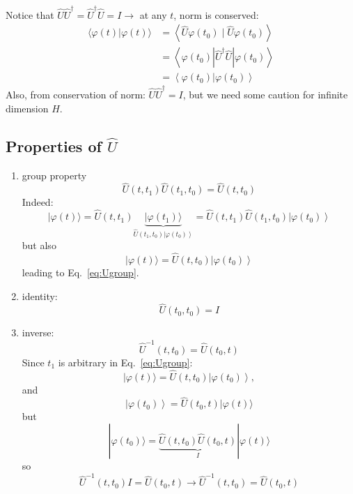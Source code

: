 \documentclass[12pt]{article}
\begin{document}
Notice that $\hat{U} \hat{U}^{\dagger} = \hat{U}^{\dagger}\hat{U} = I \to$ at any $t$, norm is conserved:
\begin{equation}
\begin{aligned}
\langle\varphi(t) | \varphi(t)\rangle 
&=\left\langle\hat{U} \varphi\left(t_{0}\right) \mid \hat{U} \varphi\left(t_{0}\right)\right\rangle \\ 
&=\left\langle\varphi\left(t_{0}\right)\left|\hat{U}^{\dagger} \hat{U}\right| \varphi\left(t_{0}\right)\right\rangle \\ 
&=\left\langle\varphi\left(t_{0}\right) | \varphi\left(t_{0}\right)\right\rangle 
\end{aligned}
\end{equation}
Also, from conservation of norm: $\hat{U} \hat{U}^{\dagger} = I$, but we need some caution for infinite dimension $H$.


\subsection{Properties of $\hat{U}$}

\begin{enumerate}
\item group property
\begin{equation}
\hat{U}\left(t, t_{1}\right) \hat{U}\left(t_{1}, t_{0}\right)=\hat{U}\left(t, t_{0}\right)
\label{eq:Ugroup}
\end{equation}
Indeed:
\[
|\varphi(t)\rangle=
\hat{U}\left(t, t_{1}\right)\underbrace{|\varphi\left(t_{1}\right)\rangle}%
_{\hat{U}\left(t_{1}, t_{0}\right)\left|\varphi\left(t_{0}\right)\right\rangle}
=\hat{U}\left(t, t_{1}\right) \hat{U}\left(t_{1}, t_{0}\right)\left|\varphi\left(t_{0}\right)\right\rangle
\]
but also 
\[
|\varphi(t)\rangle = \hat{U}\left(t, t_{0}\right)\left|\varphi\left(t_{0}\right)\right\rangle
\]
leading to Eq.~\ref{eq:Ugroup}.
%
\item identity: 
\begin{equation}
\hat{U}(t_0,t_0) = I
\end{equation}
%
\item inverse:
\begin{equation}
\hat{U}^{-1}\left(t, t_{0}\right)=\hat{U}\left(t_{0}, t\right)
\end{equation}
Since $t_1$ is arbitrary in Eq.~\ref{eq:Ugroup}:
\[
|\varphi(t)\rangle=\hat{U}\left(t, t_{0}\right)\left|\varphi\left(t_{0}\right)\right\rangle,
\]
and
\[
\left|\varphi\left(t_{0}\right)\right\rangle=\hat{U}\left(t_{0}, t\right)|\varphi(t)\rangle
\]
but
\[
|\varphi(t_0)\rangle = \underbrace{\hat{U}\left(t, t_{0}\right) \hat{U}\left(t_{0}, t\right)}%
_{I}%
|\varphi(t)\rangle
\]
so
\[
\hat{U}^{-1}\left(t, t_{0}\right) I=\hat{U}\left(t_{0}, t\right) \rightarrow \hat{U}^{-1}\left(t, t_{0}\right)=\hat{U}\left(t_{0}, t\right)
\]
\end{enumerate}
\end{document}
